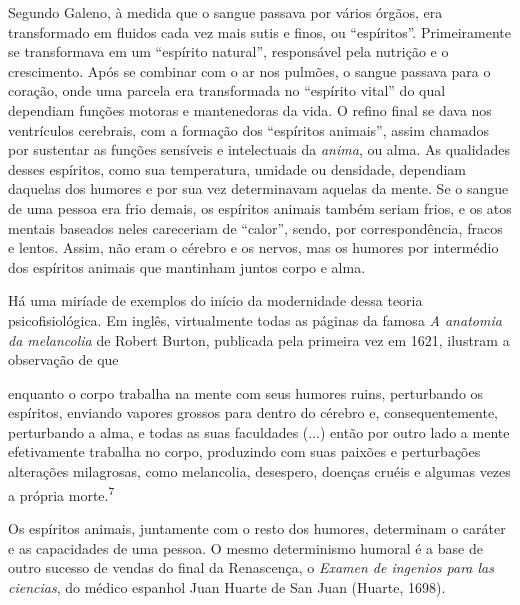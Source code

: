 Segundo Galeno, à medida que o sangue passava por vários órgãos, era
transformado em fluidos cada vez mais sutis e finos, ou ``espíritos''.
Primeiramente se transformava em um ``espírito natural'', responsável
pela nutrição e o crescimento. Após se combinar com o ar nos pulmões, o
sangue passava para o coração, onde uma parcela era transformada no
``espírito vital'' do qual dependiam funções motoras e mantenedoras da
vida. O refino final se dava nos ventrículos cerebrais, com a formação
dos ``espíritos animais'', assim chamados por sustentar as funções
sensíveis e intelectuais da \emph{anima}, ou alma. As qualidades desses
espíritos, como sua temperatura, umidade ou densidade, dependiam
daquelas dos humores e por sua vez determinavam aquelas da mente. Se o
sangue de uma pessoa era frio demais, os espíritos animais também seriam
frios, e os atos mentais baseados neles careceriam de ``calor'', sendo,
por correspondência, fracos e lentos. Assim, não eram o cérebro e os
nervos, mas os humores por intermédio dos espíritos animais que
mantinham juntos corpo e alma.

Há uma miríade de exemplos do início da modernidade dessa teoria
psicofisiológica. Em inglês, virtualmente todas as páginas da famosa
\emph{A anatomia da melancolia} de Robert Burton, publicada pela
primeira vez em 1621, ilustram a observação de que

enquanto o corpo trabalha na mente com seus humores ruins, perturbando
os espíritos, enviando vapores grossos para dentro do cérebro e,
consequentemente, perturbando a alma, e todas as suas faculdades (...)
então por outro lado a mente efetivamente trabalha no corpo, produzindo
com suas paixões e perturbações alterações milagrosas, como melancolia,
desespero, doenças cruéis e algumas vezes a própria
morte.\textsuperscript{7}

Os espíritos animais, juntamente com o resto dos humores, determinam o
caráter e as capacidades de uma pessoa. O mesmo determinismo humoral é a
base de outro sucesso de vendas do final da Renascença, o \emph{Examen
de ingenios para las ciencias}, do médico espanhol Juan Huarte de San
Juan (Huarte, 1698).

